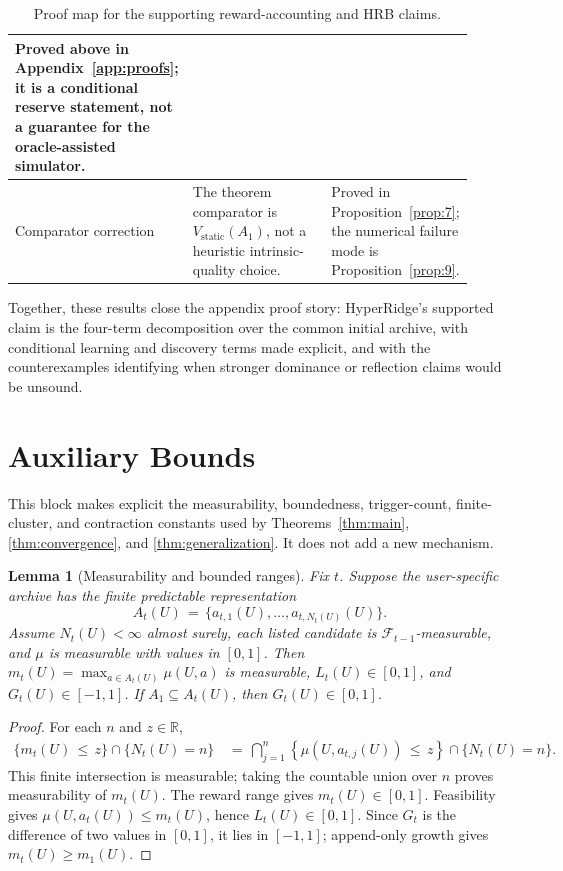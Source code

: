 \documentclass{article} %
\newtheorem{lemma}[theorem]{Lemma}
\begin{document}
\begin{table}[h]
\begin{tabular}{p{0.24\linewidth}p{0.39\linewidth}p{0.28\linewidth}}
Proved above in Appendix~\ref{app:proofs}; it is a conditional reserve statement, not a guarantee for the oracle-assisted simulator. \\
\midrule
Comparator correction &
The theorem comparator is \(V_{\mathrm{static}}(A_1)\), not a heuristic intrinsic-quality choice. &
Proved in Proposition~\ref{prop:7}; the numerical failure mode is Proposition~\ref{prop:9}. \\
\bottomrule
\end{tabular}
\caption{Proof map for the supporting reward-accounting and HRB claims.}
\label{tab:app-claim-map}
\end{table}

Together, these results close the appendix proof story: HyperRidge's supported claim is the four-term decomposition over the common initial archive, with conditional learning and discovery terms made explicit, and with the counterexamples identifying when stronger dominance or reflection claims would be unsound.

\section{Auxiliary Bounds}

\label{app:proofs-extra}

This block makes explicit the measurability, boundedness, trigger-count,
finite-cluster, and contraction constants used by
Theorems~\ref{thm:main}, \ref{thm:convergence}, and
\ref{thm:generalization}. It does not add a new mechanism.

\begin{lemma}[Measurability and bounded ranges]
\label{lem:measurable-bounded-ranges}
Fix \(t\).  Suppose the user-specific archive has the finite predictable
representation
\begin{equation}
A_t(U)
\,=\,
\{a_{t,1}(U),\ldots,a_{t,N_t(U)}(U)\}.
\end{equation}
Assume \(N_t(U)<\infty\) almost surely, each listed candidate is
\(\mathcal F_{t-1}\)-measurable, and \(\mu\) is measurable with values in
\([0,1]\).  Then \(m_t(U)=\max_{a\in A_t(U)}\mu(U,a)\) is measurable,
\(L_t(U)\in[0,1]\), and \(G_t(U)\in[-1,1]\).  If
\(A_1\subseteq A_t(U)\), then \(G_t(U)\in[0,1]\).
\end{lemma}

\begin{proof}
For each \(n\) and \(z\in\mathbb R\),
\begin{equation}
\begin{aligned}
\{m_t(U)\,\le\, z\}\cap\{N_t(U)=n\}
&\,=\,
\bigcap_{j=1}^{n}
\left\{
\mu\!\left(U,a_{t,j}(U)\right)\,\le\, z
\right\}
\cap
\{N_t(U)=n\}.
\end{aligned}
\end{equation}
This finite intersection is measurable; taking the countable union over
\(n\) proves measurability of \(m_t(U)\).  The reward range gives
\(m_t(U)\in[0,1]\).  Feasibility gives
\(\mu(U,a_t(U))\leq m_t(U)\), hence \(L_t(U)\in[0,1]\).  Since \(G_t\) is the
difference of two values in \([0,1]\), it lies in \([-1,1]\); append-only
growth gives \(m_t(U)\geq m_1(U)\).
\end{proof}
\end{document}
